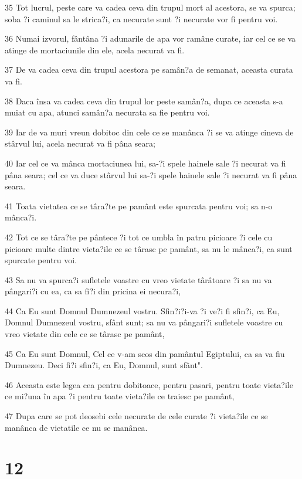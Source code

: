 \par 35 Tot lucrul, peste care va cadea ceva din trupul mort al acestora, se va spurca; soba ?i caminul sa le strica?i, ca necurate sunt ?i necurate vor fi pentru voi.
\par 36 Numai izvorul, fântâna ?i adunarile de apa vor ramâne curate, iar cel ce se va atinge de mortaciunile din ele, acela necurat va fi.
\par 37 De va cadea ceva din trupul acestora pe samân?a de semanat, aceasta curata va fi.
\par 38 Daca însa va cadea ceva din trupul lor peste samân?a, dupa ce aceasta s-a muiat cu apa, atunci samân?a necurata sa fie pentru voi.
\par 39 Iar de va muri vreun dobitoc din cele ce se manânca ?i se va atinge cineva de stârvul lui, acela necurat va fi pâna seara;
\par 40 Iar cel ce va mânca mortaciunea lui, sa-?i spele hainele sale ?i necurat va fi pâna seara; cel ce va duce stârvul lui sa-?i spele hainele sale ?i necurat va fi pâna seara.
\par 41 Toata vietatea ce se târa?te pe pamânt este spurcata pentru voi; sa n-o mânca?i.
\par 42 Tot ce se târa?te pe pântece ?i tot ce umbla în patru picioare ?i cele cu picioare multe dintre vieta?ile ce se târasc pe pamânt, sa nu le mânca?i, ca sunt spurcate pentru voi.
\par 43 Sa nu va spurca?i sufletele voastre cu vreo vietate târâtoare ?i sa nu va pângari?i cu ea, ca sa fi?i din pricina ei necura?i,
\par 44 Ca Eu sunt Domnul Dumnezeul vostru. Sfin?i?i-va ?i ve?i fi sfin?i, ca Eu, Domnul Dumnezeul vostru, sfânt sunt; sa nu va pângari?i sufletele voastre cu vreo vietate din cele ce se târasc pe pamânt,
\par 45 Ca Eu sunt Domnul, Cel ce v-am scos din pamântul Egiptului, ca sa va fiu Dumnezeu. Deci fi?i sfin?i, ca Eu, Domnul, sunt sfânt".
\par 46 Aceasta este legea cea pentru dobitoace, pentru pasari, pentru toate vieta?ile ce mi?una în apa ?i pentru toate vieta?ile ce traiesc pe pamânt,
\par 47 Dupa care se pot deosebi cele necurate de cele curate ?i vieta?ile ce se manânca de vietatile ce nu se manânca.

\chapter{12}

